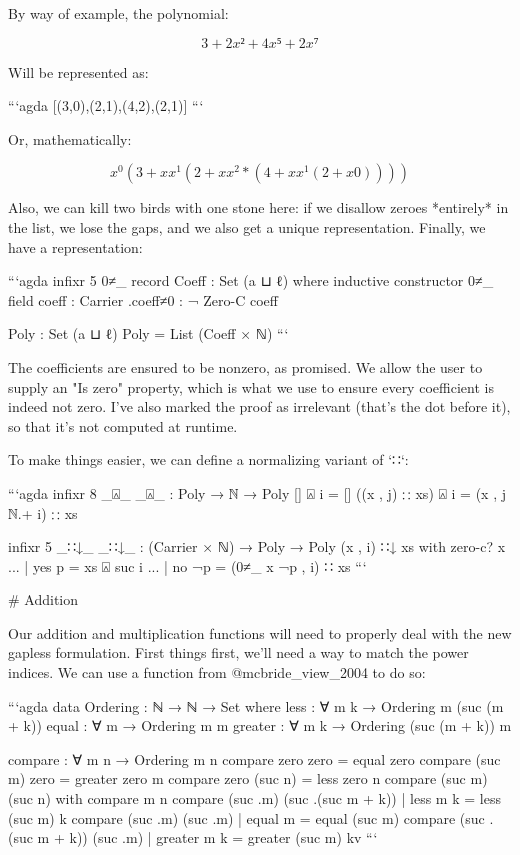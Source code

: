 \documentclass{article}
\begin{document}
By way of example, the polynomial:

$$ 3 + 2x² + 4x⁵ + 2x⁷ $$

Will be represented as:

```agda
[(3,0),(2,1),(4,2),(2,1)]
```

Or, mathematically:

$$ x^0 (3 + x x^1 (2 + x x^2 * (4 + x x^1 (2 + x 0)))) $$


Also, we can kill two birds with one stone here: if we disallow zeroes
*entirely* in the list, we lose the gaps, and we also get a unique
representation. Finally, we have a representation:

```agda
infixr 5 0≠_
record Coeff : Set (a ⊔ ℓ) where
  inductive
  constructor 0≠_
  field
    coeff : Carrier
    .{coeff≠0} : ¬ Zero-C coeff

Poly : Set (a ⊔ ℓ)
Poly = List (Coeff × ℕ)
```

The coefficients are ensured to be nonzero, as promised. We allow the user to
supply an "Is zero" property, which is what we use to ensure every coefficient
is indeed not zero. I've also marked the proof as irrelevant (that's the dot
before it), so that it's not computed at runtime.

To make things easier, we can define a normalizing variant of `∷`:

```agda
infixr 8 _⍓_
_⍓_ : Poly → ℕ → Poly
[] ⍓ i = []
((x , j) ∷ xs) ⍓ i = (x , j ℕ.+ i) ∷ xs

infixr 5 _∷↓_
_∷↓_ : (Carrier × ℕ) → Poly → Poly
(x , i) ∷↓ xs with zero-c? x
... | yes p = xs ⍓ suc i
... | no ¬p = (0≠_ x {¬p} , i) ∷ xs
```

# Addition

Our addition and multiplication functions will need to properly deal with the
new gapless formulation. First things first, we'll need a way to match the power
indices. We can use a function from @mcbride_view_2004 to do so:

```agda
data Ordering : ℕ → ℕ → Set where
  less    : ∀ m k → Ordering m (suc (m + k))
  equal   : ∀ m   → Ordering m m
  greater : ∀ m k → Ordering (suc (m + k)) m

compare : ∀ m n → Ordering m n
compare zero    zero    = equal   zero
compare (suc m) zero    = greater zero m
compare zero    (suc n) = less    zero n
compare (suc m) (suc n) with compare m n
compare (suc .m)           (suc .(suc m + k)) | less    m k = less    (suc m) k
compare (suc .m)           (suc .m)           | equal   m   = equal   (suc m)
compare (suc .(suc m + k)) (suc .m)           | greater m k = greater (suc m) kv
```
\end{document}
